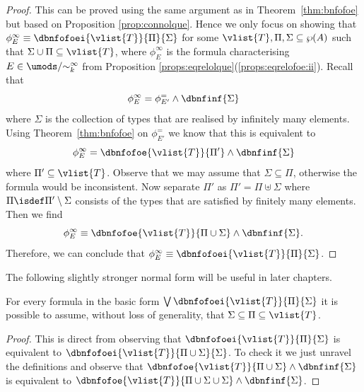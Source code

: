 \begin{proof}
This can be proved using the same argument as in Theorem~\ref{thm:bnfofoe} but based on Proposition \ref{prop:connolque}. 
Hence we only focus on showing that $\phi_E^\infty \equiv 
\dbnfofoei{\vlist{T}}{\Pi}{\Sigma}$ for some 
$\vlist{T},\Pi,\Sigma \subseteq \wp(A)$ such that $\Sigma \cup \Pi \subseteq
\vlist{T}$, where $\phi_E^\infty$ is the formula characterising
$E \in \umods/{\sim^\infty_k}$ from 
Proposition \ref{props:eqrelolque}(\ref{props:eqrelofoe:ii}). 
Recall that
\[
\phi^\infty_E = \phi^=_{E'} \land \dbnfinf{\Sigma}
\]
where $\Sigma$ is the collection of types that are realised by infinitely many 
elements.
Using Theorem~\ref{thm:bnfofoe} on $\phi^=_{E'}$ we know that this is 
equivalent to
\[
\phi^\infty_E = \dbnfofoe{\vlist{T}}{\Pi'} \land \dbnfinf{\Sigma}
\]
where $\Pi' \subseteq \vlist{T}$.
Observe that we may assume that $\Sigma \subseteq \Pi$, otherwise the formula 
would be inconsistent.
Now separate $\Pi'$ as $\Pi' = \Pi \uplus \Sigma$ where $\Pi \isdef 
\Pi'\setminus\Sigma$ consists of the types that are satisfied by finitely many 
elements.
Then we find 
\[
\phi^\infty_E \equiv 
\dbnfofoe{\vlist{T}}{\Pi\cup\Sigma} \land \dbnfinf{\Sigma}.
\]
Therefore, we can conclude that $\phi^\infty_E \equiv 
\dbnfofoei{\vlist{T}}{\Pi}{\Sigma}$.
\end{proof}

\noindent
The following slightly stronger normal form will be useful in later 
chapters.

\begin{proposition}\label{prop:bfofoei-sigmapi}
For every formula in the basic form $\bigvee \dbnfofoei{\vlist{T}}{\Pi}{\Sigma}$
it is possible to assume, without loss of generality, that $\Sigma \subseteq 
\Pi \subseteq \vlist{T}$.
\end{proposition}
\begin{proof}
This is direct from observing that $\dbnfofoei{\vlist{T}}{\Pi}{\Sigma}$ is 
equivalent to $\dbnfofoei{\vlist{T}}{\Pi\cup\Sigma}{\Sigma}$. 
To check it we just unravel the definitions and observe that
$\dbnfofoe{\vlist{T}}{\Pi \cup \Sigma} \land \dbnfinf{\Sigma}$ is equivalent to
$\dbnfofoe{\vlist{T}}{\Pi \cup \Sigma \cup \Sigma} \land \dbnfinf{\Sigma}$.
\end{proof}
